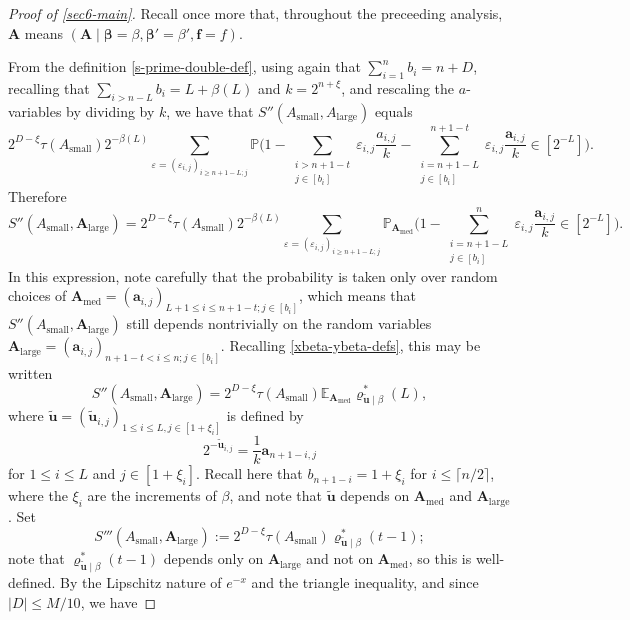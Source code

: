 \documentclass[11pt,reqno]{amsart}
\numberwithin{equation}{section}
\theoremstyle{definition}
\theoremstyle{remark}
\newcommand{\mb}{\mathbb}
\newcommand{\mbf}{\mathbf}
\newcommand{\eps}{\varepsilon}
\def\boldbeta{\boldsymbol\beta}
\renewcommand{\le}{\leqslant}
\renewcommand{\ge}{\geqslant}
\def\sml{\operatorname{small}}
\def\lrg{\operatorname{large}}
\def\med{\operatorname{med}}
\begin{document}
\begin{proof}[Proof of \cref{sec6-main}]
Recall once more that, throughout the preceeding analysis, $\mbf{A}$ means $(\mbf{A} \mid \boldbeta = \beta, \boldbeta' = \beta', \mbf{f} = f)$.



From the definition \cref{s-prime-double-def}, using again that $\sum_{i = 1}^n b_i = n + D$, recalling that $\sum_{i > n - L} b_i = L + \beta(L)$ and $k = 2^{n + \xi}$, and rescaling the $a$-variables by dividing by $k$, we have that $S''(A_{\sml}, A_{\lrg})$ equals
\[  2^{D - \xi} \tau(A_{\sml}) 2^{-\beta(L)}\sum_{\eps = (\eps_{i,j})_{i \ge n +1 - L; j}} \mb{P} \big(1 - \sum_{\substack{i > n +1 - t \\ j \in [b_i]}} \eps_{i,j} \frac{a_{i,j}}{k}  - \sum_{\substack{i = n +1 - L \\ j \in [b_i]}}^{n +1 - t} \eps_{i,j} \frac{\mbf{a}_{i,j}}{k} \in [2^{- L}] \big). \]
Therefore
\[ S''(A_{\sml}, \mbf{A}_{\lrg})  = 2^{D - \xi} \tau(A_{\sml}) 2^{-\beta(L)}\sum_{\eps = (\eps_{i,j})_{i \ge n +1 - L; j}} \mb{P}_{\mbf{A}_{\med}} \big(1 -  \sum_{\substack{i = n +1 - L \\ j \in [b_i]}}^{n} \eps_{i,j} \frac{\mbf{a}_{i,j}}{k} \in [2^{- L}] \big). \] In this expression, note carefully that the probability is taken only over random choices of $\mbf{A}_{\med} = (\mbf{a}_{i,j})_{L +1 \le i \le n + 1 - t; j \in [b_i]}$, which means that $S''(A_{\sml},\mbf{A}_{\lrg})$ still depends nontrivially on the random variables $\mbf{A}_{\lrg} = (\mbf{a}_{i,j})_{n +1 - t < i \le n; j \in [b_i]}$.
Recalling \cref{xbeta-ybeta-defs}, this may be written
\begin{equation*} S''(A_{\sml}, \mbf{A}_{\lrg})  = 2^{D - \xi} \tau(A_{\sml})  \mb{E}_{\mbf{A}_{\med}} \varrho^*_{\tilde{\mbf{u}} \mid \beta}(L),\end{equation*} where $\tilde{\mbf{u}} = (\tilde{\mbf{u}}_{i,j})_{1 \le i \le L, j \in [1 + \xi_i]}$ is defined by \begin{equation}\label{utilde-def} 2^{-\tilde{\mbf{u}}_{i,j}} = \frac{1}{k}\mbf{a}_{n +1 - i,j}\end{equation} for $1 \le i \le L$ and $j \in [1 + \xi_i]$.  Recall here that $b_{n +1 - i} = 1 + \xi_i$ for $i \le \lceil n/2\rceil$, where the $\xi_i$ are the increments of $\beta$, and note that $\tilde{\mbf{u}}$ depends on $\mbf{A}_{\med}$ and $\mbf{A}_{\lrg}$.
Set 
\begin{equation}\label{s-triple-prime} S'''(A_{\sml}, \mbf{A}_{\lrg}) := 2^{D - \xi} \tau(A_{\sml}) \varrho^*_{\tilde{\mbf{u}} \mid \beta}(t-1);
\end{equation} note that $\varrho^*_{\tilde{\mbf{u}} \mid \beta}(t-1)$ depends only on $\mbf{A}_{\lrg}$ and not on $\mbf{A}_{\med}$, so this is well-defined. By the Lipschitz nature of $e^{-x}$ and the triangle inequality, and since $|D| \le M/10$, we have 

\end{proof}
\end{document}
